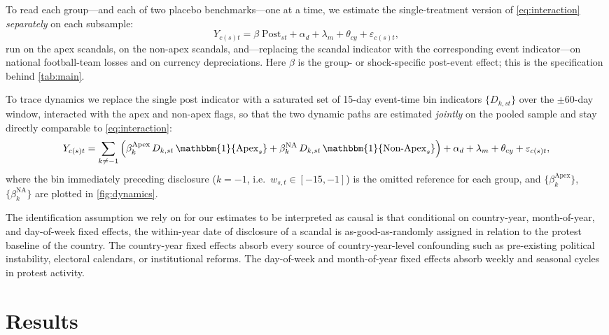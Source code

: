 \documentclass[11pt]{article}
\let\mathbetasym\beta
\renewcommand{\beta}{\ensuremath{\mathbetasym}}
\begin{document}
To read each group---and each of two placebo benchmarks---one at a time, we estimate the single-treatment version of \autoref{eq:interaction} \emph{separately} on each subsample:
\begin{equation}
\label{eq:main}
    Y_{c(s)t} = \beta \; \text{Post}_{st} + \alpha_{d} + \lambda_{m} + \theta_{cy} + \varepsilon_{c(s)t},
\end{equation}
run on the apex scandals, on the non-apex scandals, and---replacing the scandal indicator with the corresponding event indicator---on national football-team losses and on currency depreciations. Here $\beta$ is the group- or shock-specific post-event effect; this is the specification behind \autoref{tab:main}.

To trace dynamics we replace the single post indicator with a saturated set of 15-day event-time bin indicators $\{D_{k,st}\}$ over the $\pm 60$-day window, interacted with the apex and non-apex flags, so that the two dynamic paths are estimated \emph{jointly} on the pooled sample and stay directly comparable to \autoref{eq:interaction}:
\begin{equation}
\label{eq:dynamics}
    Y_{c(s)t} = \sum_{k \neq -1} \left( \beta^{\text{Apex}}_{k}\, D_{k,st}\, \mathbbm{1}\{\text{Apex}_s\} + \beta^{\text{NA}}_{k}\, D_{k,st}\, \mathbbm{1}\{\text{Non-Apex}_s\} \right) + \alpha_{d} + \lambda_{m} + \theta_{cy} + \varepsilon_{c(s)t},
\end{equation}
where the bin immediately preceding disclosure ($k=-1$, i.e.\ $w_{s,t}\in[-15,-1]$) is the omitted reference for each group, and $\{\beta^{\text{Apex}}_{k}\}$, $\{\beta^{\text{NA}}_{k}\}$ are plotted in \autoref{fig:dynamics}.

The identification assumption we rely on for our estimates to be interpreted as causal is that conditional on country-year, month-of-year, and day-of-week fixed effects, the within-year date of disclosure of a scandal is as-good-as-randomly assigned in relation to the protest baseline of the country. The country-year fixed effects absorb every source of country-year-level confounding such as pre-existing political instability, electoral calendars, or institutional reforms. The day-of-week and month-of-year fixed effects absorb weekly and seasonal cycles in protest activity.

\section{Results}
\end{document}
